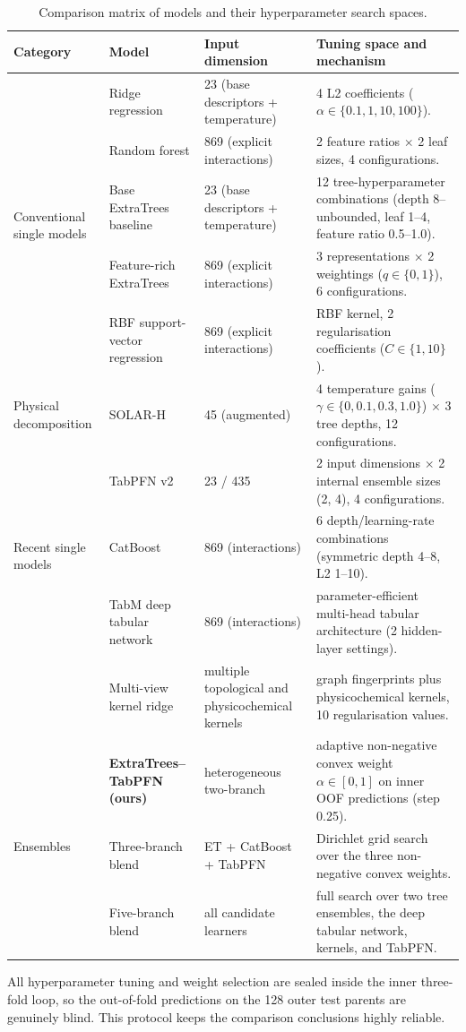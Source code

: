 \begin{table}[htbp]
  \centering\small
  \caption{Comparison matrix of models and their hyperparameter search spaces.}
  \label{tab:v2-experiment-matrix}
  \begin{tabularx}{\linewidth}{@{}lllX@{}}
    \toprule
    Category & Model & Input dimension & Tuning space and mechanism \\
    \midrule
    \multirow{5}{*}{Conventional single models}
    & Ridge regression & 23 (base descriptors + temperature) & 4 L2 coefficients ($\alpha \in \{0.1, 1, 10, 100\}$). \\
    & Random forest & 869 (explicit interactions) & 2 feature ratios $\times$ 2 leaf sizes, 4 configurations. \\
    & Base ExtraTrees baseline & 23 (base descriptors + temperature) & 12 tree-hyperparameter combinations (depth 8--unbounded, leaf 1--4, feature ratio 0.5--1.0). \\
    & Feature-rich ExtraTrees & 869 (explicit interactions) & 3 representations $\times$ 2 weightings ($q \in \{0, 1\}$), 6 configurations. \\
    & RBF support-vector regression & 869 (explicit interactions) & RBF kernel, 2 regularisation coefficients ($C \in \{1, 10\}$). \\
    \midrule
    Physical decomposition & SOLAR-H & 45 (augmented) & 4 temperature gains ($\gamma \in \{0, 0.1, 0.3, 1.0\}$) $\times$ 3 tree depths, 12 configurations. \\
    \midrule
    \multirow{3}{*}{Recent single models}
    & TabPFN v2 & 23 / 435 & 2 input dimensions $\times$ 2 internal ensemble sizes (2, 4), 4 configurations. \\
    & CatBoost & 869 (interactions) & 6 depth/learning-rate combinations (symmetric depth 4--8, L2 1--10)\cite{catboost2018}. \\
    & TabM deep tabular network & 869 (interactions) & parameter-efficient multi-head tabular architecture (2 hidden-layer settings)\cite{tabm2025}. \\
    & Multi-view kernel ridge & multiple topological and physicochemical kernels & graph fingerprints plus physicochemical kernels, 10 regularisation values. \\
    \midrule
    \multirow{3}{*}{Ensembles}
    & \textbf{ExtraTrees--TabPFN (ours)} & heterogeneous two-branch & adaptive non-negative convex weight $\alpha \in [0, 1]$ on inner OOF predictions (step 0.25). \\
    & Three-branch blend & ET + CatBoost + TabPFN & Dirichlet grid search over the three non-negative convex weights. \\
    & Five-branch blend & all candidate learners & full search over two tree ensembles, the deep tabular network, kernels, and TabPFN. \\
    \bottomrule
  \end{tabularx}
\end{table}

All hyperparameter tuning and weight selection are sealed inside the inner three-fold loop, so the out-of-fold predictions on the 128 outer test parents are genuinely blind. This protocol keeps the comparison conclusions highly reliable.

